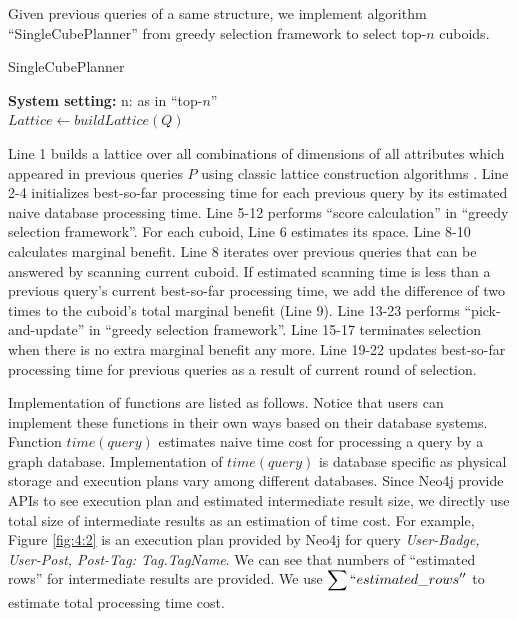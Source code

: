 Given previous queries of a same structure, we implement algorithm ``SingleCubePlanner'' from greedy selection framework to select top-$n$ cuboids. 

\begin{algorithm}[H]
	\caption{SingleCubePlanner}
	\LinesNumbered 
	\textbf{System setting:} n: as in ``top-$n$''\\ 
	$Lattice \leftarrow buildLattice(Q)$\;
	
\end{algorithm}
\clearpage

Line 1 builds a lattice over all combinations of dimensions of all attributes which appeared in previous queries $P$ using classic lattice construction algorithms \cite{DBLP:journals/ipl/NourineR99}. Line 2-4 initializes best-so-far processing time for each previous query by its estimated naive database processing time. Line 5-12 performs ``score calculation'' in ``greedy selection framework''. For each cuboid, Line 6 estimates its space. Line 8-10 calculates marginal benefit. Line 8 iterates over previous queries that can be answered by scanning current cuboid. If estimated scanning time is less than a previous query's current best-so-far processing time, we add the difference of two times to the cuboid's total marginal benefit (Line 9). Line 13-23 performs ``pick-and-update'' in ``greedy selection framework''. Line 15-17 terminates selection when there is no extra marginal benefit any more. Line 19-22 updates best-so-far processing time for previous queries as a result of current round of selection.

Implementation of functions are listed as follows. Notice that users can implement these functions in their own ways based on their database systems. Function \textbf{$time(query)$} estimates naive time cost for processing a query by a graph database. Implementation of $time(query)$ is database specific as physical storage and execution plans vary among different databases. Since Neo4j provide APIs to see execution plan and estimated intermediate result size, we directly use total size of intermediate results as an estimation of time cost. For example, Figure \ref{fig:4:2} is an execution plan provided by Neo4j for query \textit{User-Badge, User-Post, Post-Tag: Tag.TagName}. We can see that numbers of ``estimated rows'' for intermediate results are provided. We use  $\displaystyle{\sum ``estimated\_rows''}$ to estimate total processing time cost.

